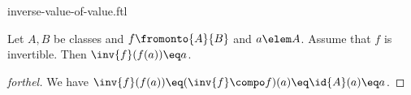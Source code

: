\documentclass{stex}
\begin{document}
\begin{smodule}{inverse-value-of-value.ftl}


\begin{proposition}[forthel,id=InvOfValueProp]
  Let $A, B$ be classes and $f \fromonto{A}{B}$ and $a \elem A$.
  Assume that $f$ is invertible.
  Then $\inv{f}(f(a)) \eq a$.
\end{proposition}
\begin{proof}[forthel]
  We have $\inv{f}(f(a)) \eq (\inv{f} \compo f)(a) \eq \id{A}(a) \eq a$.
\end{proof}

\end{smodule}
\end{document}
